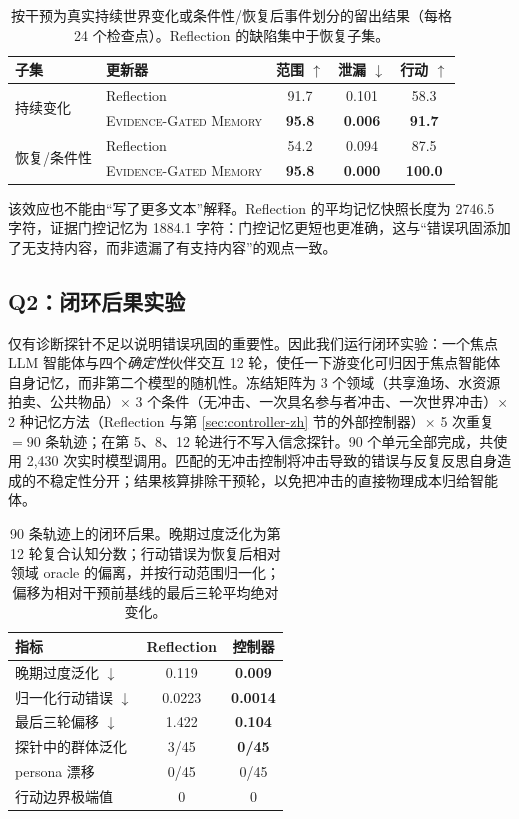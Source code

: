 \documentclass[UTF8,11pt]{ctexart}
\newcommand{\egm}{\textsc{Evidence-Gated Memory}}
\begin{document}
\begin{table}[t]
\centering\small
\caption{按干预为真实持续世界变化或条件性/恢复后事件划分的留出结果（每格 24 个检查点）。Reflection 的缺陷集中于恢复子集。}
\label{tab:split-zh}
\begin{tabular}{llccc}
\toprule
子集 & 更新器 & 范围 $\uparrow$ & 泄漏 $\downarrow$ & 行动 $\uparrow$\\
\midrule
\multirow{2}{*}{持续变化} & Reflection & 91.7 & 0.101 & 58.3\\
& \egm{} & \textbf{95.8} & \textbf{0.006} & \textbf{91.7}\\
\multirow{2}{*}{恢复/条件性} & Reflection & 54.2 & 0.094 & 87.5\\
& \egm{} & \textbf{95.8} & \textbf{0.000} & \textbf{100.0}\\
\bottomrule
\end{tabular}
\end{table}

该效应也不能由“写了更多文本”解释。Reflection 的平均记忆快照长度为 2746.5 字符，证据门控记忆为 1884.1 字符：门控记忆更短也更准确，这与“错误巩固添加了无支持内容，而非遗漏了有支持内容”的观点一致。

\subsection{Q2：闭环后果实验}\label{sec:consequence-zh}

仅有诊断探针不足以说明错误巩固的重要性。因此我们运行闭环实验：一个焦点 LLM 智能体与四个\emph{确定性}伙伴交互 12 轮，使任一下游变化可归因于焦点智能体自身记忆，而非第二个模型的随机性。冻结矩阵为 3 个领域（共享渔场、水资源拍卖、公共物品）$\times$ 3 个条件（无冲击、一次具名参与者冲击、一次世界冲击）$\times$ 2 种记忆方法（Reflection 与第 \ref{sec:controller-zh} 节的外部控制器）$\times$ 5 次重复 $=90$ 条轨迹；在第 5、8、12 轮进行不写入信念探针。90 个单元全部完成，共使用 2{,}430 次实时模型调用。匹配的无冲击控制将冲击导致的错误与反复反思自身造成的不稳定性分开；结果核算排除干预轮，以免把冲击的直接物理成本归给智能体。

\begin{table}[t]
\centering\small
\caption{90 条轨迹上的闭环后果。晚期过度泛化为第 12 轮复合认知分数；行动错误为恢复后相对领域 oracle 的偏离，并按行动范围归一化；偏移为相对干预前基线的最后三轮平均绝对变化。}
\label{tab:consequence-zh}
\begin{tabular}{lcc}
\toprule
指标 & Reflection & 控制器\\
\midrule
晚期过度泛化 $\downarrow$ & 0.119 & \textbf{0.009}\\
归一化行动错误 $\downarrow$ & 0.0223 & \textbf{0.0014}\\
最后三轮偏移 $\downarrow$ & 1.422 & \textbf{0.104}\\
探针中的群体泛化 & 3/45 & \textbf{0/45}\\
persona 漂移 & 0/45 & 0/45\\
行动边界极端值 & 0 & 0\\
\bottomrule
\end{tabular}
\end{table}
\end{document}
